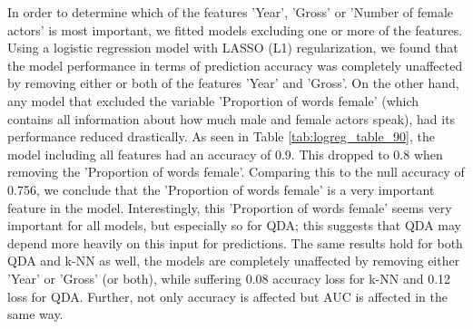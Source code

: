 \documentclass[../../project.tex]{subfiles}
\begin{document}
	In order to determine which of the features 'Year', 'Gross' or 'Number of female actors' is most important, we fitted models excluding one or more of the features. Using a logistic regression model with LASSO (L1) regularization, we found that the model performance in terms of prediction accuracy was completely unaffected by removing either or both of the features 'Year' and 'Gross'. On the other hand, any model that excluded the variable 'Proportion of words female' (which contains all information about how much male and female actors speak), had its performance reduced drastically. As seen in Table \ref{tab:logreg_table_90}, the model including all features had an accuracy of 0.9. This dropped to 0.8 when removing the 'Proportion of words female'. Comparing this to the null accuracy of 0.756, we conclude that the 'Proportion of words female' is a very important feature in the model. Interestingly, this 'Proportion of words female' seems very important for all models, but especially so for QDA; this suggests that QDA may depend more heavily on this input for predictions. The same results hold for both QDA and k-NN as well, the models are completely unaffected by removing either 'Year' or 'Gross' (or both), while suffering 0.08 accuracy loss for k-NN and 0.12 loss for QDA. Further, not only accuracy is affected but AUC is affected in the same way.%
\end{document}
